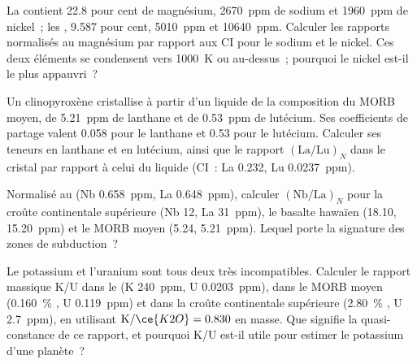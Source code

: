 \begin{exercise}[$\star\star$]\label{exo:b2:elements-in-the-earth:6}
La  contient 22.8 pour cent de magnésium, \qty{2670}{ppm}
de sodium et \qty{1960}{ppm} de nickel~; les , 9.587 pour cent,
\qty{5010}{ppm} et \qty{10640}{ppm}. Calculer les rapports normalisés au magnésium
par rapport aux CI pour le sodium et le nickel. Ces deux éléments se condensent
vers \qty{1000}{K} ou au-dessus~; pourquoi le nickel est-il le plus appauvri~?
\end{exercise}

\begin{exercise}[$\star\star$]\label{exo:b2:elements-in-the-earth:7}
Un clinopyroxène cristallise à partir d'un liquide de la composition du MORB moyen,
de \qty{5.21}{ppm} de lanthane et de \qty{0.53}{ppm} de lutécium. Ses coefficients de
partage valent 0.058 pour le lanthane et 0.53 pour le lutécium. Calculer ses teneurs
en lanthane et en lutécium, ainsi que le rapport $(\mathrm{La}/\mathrm{Lu})_N$
dans le cristal par rapport à celui du liquide (CI~: La 0.232, Lu \qty{0.0237}{ppm}).
\end{exercise}

\begin{exercise}[$\star\star$]\label{exo:b2:elements-in-the-earth:8}
Normalisé au  (Nb \qty{0.658}{ppm}, La \qty{0.648}{ppm}), calculer
$(\mathrm{Nb}/\mathrm{La})_N$ pour la croûte continentale supérieure (Nb 12,
La \qty{31}{ppm}), le basalte hawaïen (18.10, \qty{15.20}{ppm}) et le MORB moyen
(5.24, \qty{5.21}{ppm}). Lequel porte la signature des zones de subduction~?
\end{exercise}

\begin{exercise}[$\star\star$]\label{exo:b2:elements-in-the-earth:9}
Le potassium et l'uranium sont tous deux très incompatibles. Calculer le rapport
massique K/U dans le  (K \qty{240}{ppm}, U \qty{0.0203}{ppm}), dans
le MORB moyen (\qty{0.160}{\percent} , U \qty{0.119}{ppm}) et dans la croûte
continentale supérieure (\qty{2.80}{\percent} , U \qty{2.7}{ppm}), en
utilisant $\mathrm{K}/\ce{K2O} = 0.830$ en masse. Que signifie la quasi-constance de
ce rapport, et pourquoi K/U est-il utile pour estimer le potassium d'une planète~?
\end{exercise}

